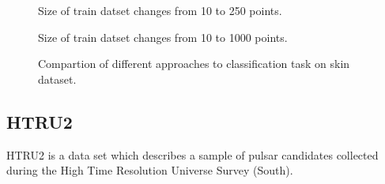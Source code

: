 \documentclass[a4paper]{article}
\begin{document}
\begin{figure}[h]
\begin{minipage}[c]{0.49\linewidth}
 Size of train datset changes from 10 to 250 points.
\end{minipage}
\vfill
\begin{minipage}[c]{0.49\linewidth}
 Size of train datset changes from 10 to 1000 points.
\end{minipage}
\caption{Compartion of different approaches to classification task on skin dataset.}
\label{Skinacc}
\end{figure}

\clearpage
\subsection{HTRU2}

HTRU2 is a data set which describes a sample of pulsar candidates collected during the High Time Resolution Universe Survey (South).
\\
\end{document}
